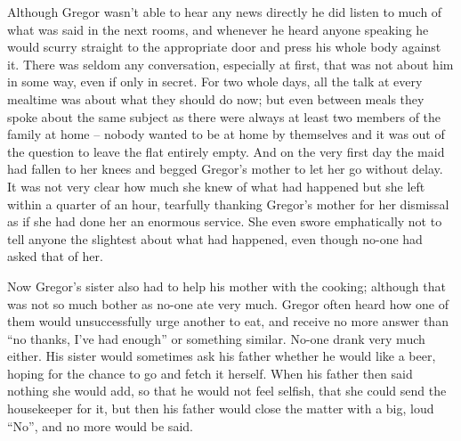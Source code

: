 Although Gregor wasn’t able to hear any news directly he did listen to
much of what was said in the next rooms, and whenever he heard anyone
speaking he would scurry straight to the appropriate door and press his
whole body against it. There was seldom any conversation, especially at
first, that was not about him in some way, even if only in secret. For
two whole days, all the talk at every mealtime was about what they
should do now; but even between meals they spoke about the same subject
as there were always at least two members of the family at home – nobody
wanted to be at home by themselves and it was out of the question to
leave the flat entirely empty. And on the very first day the maid had
fallen to her knees and begged Gregor’s mother to let her go without
delay. It was not very clear how much she knew of what had happened but
she left within a quarter of an hour, tearfully thanking Gregor’s
mother for her dismissal as if she had done her an enormous service.
She even swore emphatically not to tell anyone the slightest about what
had happened, even though no-one had asked that of her.

Now Gregor’s sister also had to help his mother with the cooking;
although that was not so much bother as no-one ate very much. Gregor
often heard how one of them would unsuccessfully urge another to eat,
and receive no more answer than “no thanks, I’ve had enough” or
something similar. No-one drank very much either. His sister would
sometimes ask his father whether he would like a beer, hoping for the
chance to go and fetch it herself. When his father then said nothing
she would add, so that he would not feel selfish, that she could send
the housekeeper for it, but then his father would close the matter with
a big, loud “No”, and no more would be said.

